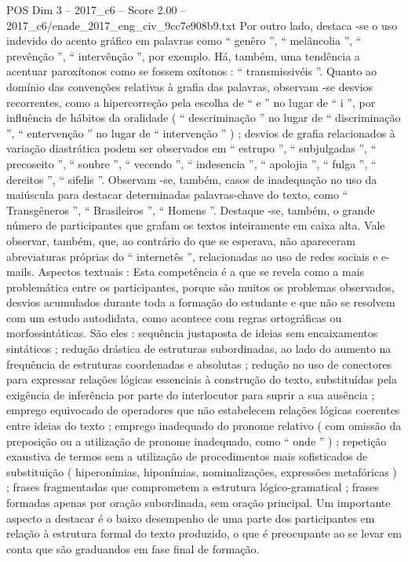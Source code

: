 \begin{textsample}{POS Dim 3 – 2017\_c6 – Score 2.00 – 2017\_c6/enade\_2017\_eng\_civ\_9cc7e908b9.txt}
Por outro lado, destaca -se o uso indevido do acento gráfico em palavras como “ genêro ”, “ melâncolia ”, “ prevênção ”, “ intervênção ”, por exemplo.
Há, também, uma tendência a acentuar paroxítonos como se fossem oxítonos : “ transmissivéis ”.
Quanto ao domínio das convenções relativas à grafia das palavras, observam -se desvios recorrentes, como a hipercorreção pela escolha de “ e ” no lugar de “ i ”, por influência de hábitos da oralidade ( “ descriminação ” no lugar de “ discriminação ”, “ entervenção ” no lugar de “ intervenção ” ) ; desvios de grafia relacionados à variação diastrática podem ser observados em “ estrupo ”, “ subjulgadas ”, “ precoseito ”, “ soubre ”, “ vecendo ”, “ indesencia ”, “ apolojia ”, “ fulga ”, “ dereitos ”, “ sifelis ”.
Observam -se, também, casos de inadequação no uso da maiúscula para destacar determinadas palavras-chave do texto, como “ Transgêneros ”, “ Brasileiros ”, “ Homens ”.
Destaque -se, também, o grande número de participantes que grafam os textos inteiramente em caixa alta.
Vale observar, também, que, ao contrário do que se esperava, não apareceram abreviaturas próprias do “ internetês ”, relacionadas ao uso de redes sociais e e-mails.
Aspectos textuais : Esta competência é a que se revela como a mais problemática entre os participantes, porque são muitos os problemas observados, desvios acumulados durante toda a formação do estudante e que não se resolvem com um estudo autodidata, como acontece com regras ortográficas ou morfossintáticas.
São eles : sequência justaposta de ideias sem encaixamentos sintáticos ; redução drástica de estruturas subordinadas, ao lado do aumento na frequência de estruturas coordenadas e absolutas ; redução no uso de conectores para expressar relações lógicas essenciais à construção do texto, substituídas pela exigência de inferência por parte do interlocutor para suprir a sua ausência ; emprego equivocado de operadores que não estabelecem relações lógicas coerentes entre ideias do texto ; emprego inadequado do pronome relativo ( com omissão da preposição ou a utilização de pronome inadequado, como “ onde ” ) ; repetição exaustiva de termos sem a utilização de procedimentos mais sofisticados de substituição ( hiperonímias, hiponímias, nominalizações, expressões metafóricas ) ; frases fragmentadas que comprometem a estrutura lógico-gramatical ; frases formadas apenas por oração subordinada, sem oração principal.
Um importante aspecto a destacar é o baixo desempenho de uma parte dos participantes em relação à estrutura formal do texto produzido, o que é preocupante ao se levar em conta que são graduandos em fase final de formação.

\end{textsample}
